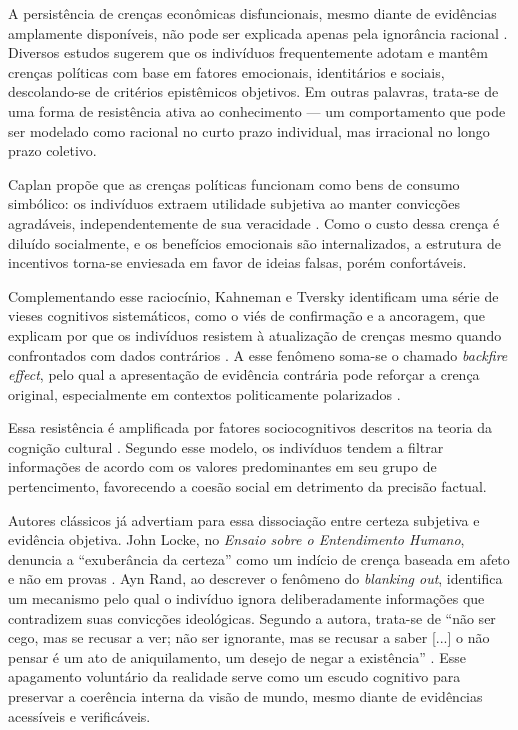 A persistência de crenças econômicas disfuncionais, mesmo diante de evidências amplamente disponíveis, não pode ser explicada apenas pela ignorância racional \cite{downs1957economic}. Diversos estudos sugerem que os indivíduos frequentemente adotam e mantêm crenças políticas com base em fatores emocionais, identitários e sociais, descolando-se de critérios epistêmicos objetivos. Em outras palavras, trata-se de uma forma de resistência ativa ao conhecimento — um comportamento que pode ser modelado como racional no curto prazo individual, mas irracional no longo prazo coletivo.

Caplan propõe que as crenças políticas funcionam como bens de consumo simbólico: os indivíduos extraem utilidade subjetiva ao manter convicções agradáveis, independentemente de sua veracidade \cite{The_Myth_of_the_Rational_Voter}. Como o custo dessa crença é diluído socialmente, e os benefícios emocionais são internalizados, a estrutura de incentivos torna-se enviesada em favor de ideias falsas, porém confortáveis.

Complementando esse raciocínio, Kahneman e Tversky identificam uma série de vieses cognitivos sistemáticos, como o viés de confirmação e a ancoragem, que explicam por que os indivíduos resistem à atualização de crenças mesmo quando confrontados com dados contrários \cite{kahneman2011thinking}. A esse fenômeno soma-se o chamado \textit{backfire effect}, pelo qual a apresentação de evidência contrária pode reforçar a crença original, especialmente em contextos politicamente polarizados \cite{nyhan2010corrections}.

Essa resistência é amplificada por fatores sociocognitivos descritos na teoria da cognição cultural \cite{kahan2012polarization}. Segundo esse modelo, os indivíduos tendem a filtrar informações de acordo com os valores predominantes em seu grupo de pertencimento, favorecendo a coesão social em detrimento da precisão factual.

Autores clássicos já advertiam para essa dissociação entre certeza subjetiva e evidência objetiva. John Locke, no \textit{Ensaio sobre o Entendimento Humano}, denuncia a ``exuberância da certeza'' como um indício de crença baseada em afeto e não em provas \cite{locke2014ensaio}. Ayn Rand, ao descrever o fenômeno do \textit{blanking out}, identifica um mecanismo pelo qual o indivíduo ignora deliberadamente informações que contradizem suas convicções ideológicas. Segundo a autora, trata-se de ``não ser cego, mas se recusar a ver; não ser ignorante, mas se recusar a saber [...] o não pensar é um ato de aniquilamento, um desejo de negar a existência'' \cite[p.~869]{rand2012revolta}. Esse apagamento voluntário da realidade serve como um escudo cognitivo para preservar a coerência interna da visão de mundo, mesmo diante de evidências acessíveis e verificáveis.

